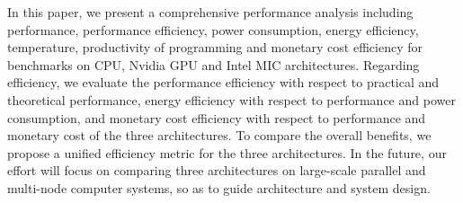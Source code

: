 In this paper, we present a comprehensive performance analysis including performance, performance efficiency, power consumption, energy efficiency, temperature, productivity of programming and monetary cost efficiency for benchmarks on CPU, Nvidia GPU and Intel MIC architectures. Regarding efficiency, we evaluate the performance efficiency with respect to practical and theoretical performance, energy efficiency with respect to performance and power consumption, and monetary cost efficiency with respect to performance and monetary cost of the three architectures. To compare the overall benefits, we propose a unified efficiency metric for the three architectures. In the future, our effort will focus on comparing three architectures on large-scale parallel and multi-node computer systems, so as to guide architecture and system design.
